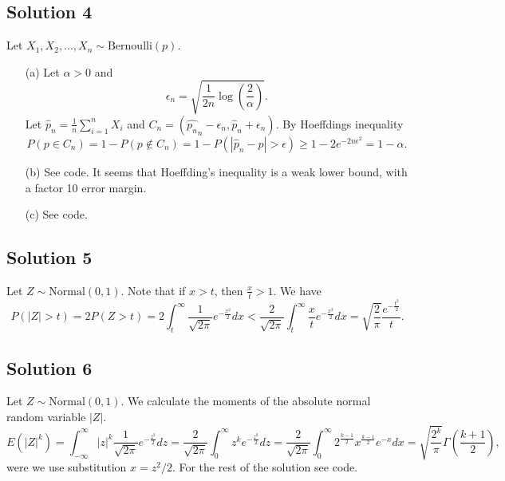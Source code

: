 \subsection*{Solution 4}

Let $X_1, X_2, ..., X_n \sim \mathrm{Bernoulli}(p)$.

\begin{itemize}
\item[(a)] Let $\alpha > 0$ and
\begin{equation*}
\epsilon_n = \sqrt{\frac{1}{2n} \log\left(\frac{2}{\alpha}\right)}.
\end{equation*}
Let $\hat{p}_n = \frac{1}{n}\sum_{i=1}^n X_i$ and $C_n = (\hat{p_n}_n - \epsilon_n, \hat{p}_n + \epsilon_n)$.
By Hoeffdings inequality
\begin{equation*}
P(p \in C_n) = 1 - P(p \notin C_n)
    = 1 - P(|\hat{p}_n - p| > \epsilon)
    \geq 1 - 2e^{-2n\epsilon^2}
    = 1 - \alpha.
\end{equation*}
\item[(b)] See code. It seems that Hoeffding's inequality is a weak lower bound, with a factor 10 error margin.
\item[(c)] See code.
\end{itemize}


\subsection*{Solution 5}

Let $Z \sim \mathrm{Normal}(0, 1)$.
Note that if $x > t$, then $\frac{x}{t} > 1$.
We have
\begin{equation*}
    P(|Z| > t) = 2P(Z > t)
        = 2 \int_t^{\infty} \frac{1}{\sqrt{2\pi}} e^{-\frac{x^2}{2}} dx
        < \frac{2}{\sqrt{2\pi}} \int_t^{\infty} \frac{x}{t} e^{-\frac{x^2}{2}} dx
        = \sqrt{\frac{2}{\pi}} \frac{e^{-\frac{t^2}{2}}}{t}.
\end{equation*}


\subsection*{Solution 6}

Let $Z \sim \mathrm{Normal}(0, 1)$.
We calculate the moments of the absolute normal random variable $|Z|$.
\begin{equation*}
    E(|Z|^k) = \int_{-\infty}^{\infty} |z|^k \frac{1}{\sqrt{2\pi}} e^{-\frac{z^2}{2}} dz
        = \frac{2}{\sqrt{2\pi}} \int_0^{\infty} z^k e^{-\frac{z^2}{2}} dz
        = \frac{2}{\sqrt{2\pi}} \int_0^{\infty} 2^{\frac{k - 1}{2}} x^{\frac{k - 1}{2}} e^{-x} dx
        = \sqrt{\frac{2^{k}}{\pi}} \Gamma\left(\frac{k+1}{2}\right),
\end{equation*}
were we use substitution $x = z^2/2$.
For the rest of the solution see code.


